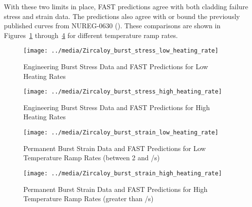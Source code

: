 With these two limits in place, FAST predictions agree with both cladding failure stress and strain
data. The predictions also agree with or bound the previously published curves from NUREG-0630
(\cite{ref:Powers1980}). These comparisons are shown in
Figures~\ref{fig:BALON2_burst_stress_low_heating_rate}
through~\ref{fig:BALON2_burst_strain_high_heating_rate} for different temperature ramp rates.

\begin{figure}
    \texttt{[image: ../media/Zircaloy\_burst\_stress\_low\_heating\_rate]}
    \caption{Engineering Burst Stress Data and FAST Predictions for Low Heating Rates}
    \label{fig:BALON2_burst_stress_low_heating_rate}
\end{figure}

\begin{figure}
    \texttt{[image: ../media/Zircaloy\_burst\_stress\_high\_heating\_rate]}
    \caption{Engineering Burst Stress Data and FAST Predictions for High Heating Rates}
    \label{fig:BALON2_burst_stress_high_heating_rate}
\end{figure}

\begin{figure}
    \texttt{[image: ../media/Zircaloy\_burst\_strain\_low\_heating\_rate]}
    \caption{Permanent Burst Strain Data and FAST Predictions for Low Temperature Ramp Rates (between 2 and /s)}
    \label{fig:BALON2_burst_strain_low_heating_rate}
\end{figure}

\begin{figure}
    \texttt{[image: ../media/Zircaloy\_burst\_strain\_high\_heating\_rate]}
    \caption{Permanent Burst Strain Data and FAST Predictions for High Temperature Ramp Rates (greater than /s)}
    \label{fig:BALON2_burst_strain_high_heating_rate}
\end{figure}

